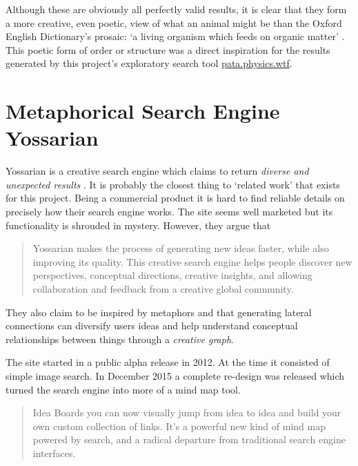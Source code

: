 Although these are obviously all perfectly valid results, it is clear that they form a more creative, even poetic, view of what an animal might be than the Oxford English Dictionary's prosaic: `a living organism which feeds on organic matter' \citeyear{OEDanimal}. This poetic form of order or structure was a direct inspiration for the results generated by this project's exploratory search tool \url{pata.physics.wtf}.


\section{Metaphorical Search Engine Yossarian}
\label{s:yossarian}

Yossarian is a creative search engine which claims to return \emph{diverse and unexpected results} \citeyear{Yossarian2015}. It is probably the closest thing to `related work' that exists for this project. Being a commercial product it is hard to find reliable details on precisely how their search engine works. The site seems well marketed but its functionality is shrouded in mystery. However, they argue that

\begin{quotation}
  Yossarian makes the process of generating new ideas faster, while also improving its quality. This creative search engine helps people discover new perspectives, conceptual directions, creative insights, and allowing collaboration and feedback from a creative global community. 
\end{quotation}

They also claim to be inspired by metaphors and that generating lateral connections can diversify users ideas and help understand conceptual relationships between things through a \emph{creative graph}.

The site started in a public alpha release in 2012. At the time it consisted of simple image search. In December 2015 a complete re-design was released \autocite{YossarianEmail} which turned the search engine into more of a mind map tool.

\begin{quotation}
  Idea Boards you can now visually jump from idea to idea and build your own custom collection of links. It's a powerful new kind of mind map powered by search, and a radical departure from traditional search engine interfaces. 
\end{quotation}

